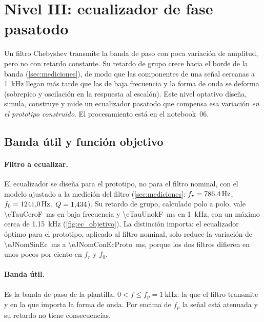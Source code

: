 \section{Nivel III: ecualizador de fase pasatodo}
\label{sec:nivel3}

Un filtro Chebyshev transmite la banda de paso con poca variación de amplitud, pero no con retardo constante. Su retardo de grupo crece hacia el
borde de la banda (\cref{sec:mediciones}), de modo que las componentes de una señal cercanas a \qty{1}{\kilo\hertz} llegan más tarde que las de baja
frecuencia y la forma de onda se deforma (sobrepico y oscilación en la respuesta al escalón). Este nivel optativo diseña, simula, construye y mide un
ecualizador pasatodo que compensa esa variación \emph{en el prototipo construido}. El procesamiento está en el notebook~06.

\subsection{Banda útil y función objetivo}
\paragraph{Filtro a ecualizar.} El ecualizador se diseña para el prototipo, no para el filtro nominal, con el modelo ajustado a la medición del
filtro (\cref{sec:mediciones}: $f_r = \qr{1}{\eProtoFr}{\hertz}$, $f_0 = \qr{1}{\eProtoFo}{\hertz}$, $Q = \nr{3}{\eProtoQ}$). Su retardo de grupo, calculado
polo a polo, vale \qty{\eTauCeroF}{\milli\second} en baja frecuencia y \qty{\eTauUnokF}{\milli\second} en \qty{1}{\kilo\hertz}, con un máximo cerca
de \qty{1.15}{\kilo\hertz} (\cref{fig:ec_objetivo}). La distinción importa: el ecualizador óptimo para el prototipo, aplicado al filtro nominal, solo
reduce la variación de \qty{\eJNomSinEc}{\milli\second} a \qty{\eJNomConEcProto}{\milli\second}, porque los dos filtros difieren en unos pocos por
ciento en $f_r$ y $f_0$.

\paragraph{Banda útil.} Es la banda de paso de la plantilla, $0 < f \le f_p = \qty{1}{\kilo\hertz}$: la que el filtro transmite y en la que importa
la forma de onda. Por encima de $f_p$ la señal está atenuada y su retardo no tiene consecuencias.

